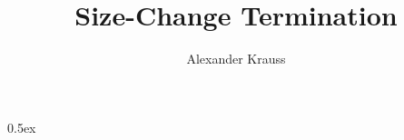 \documentclass[11pt,a4paper]{article}
\begin{document}
\title{Size-Change Termination}
\author{Alexander Krauss}
\maketitle


\parindent 0pt\parskip 0.5ex


\end{document}
